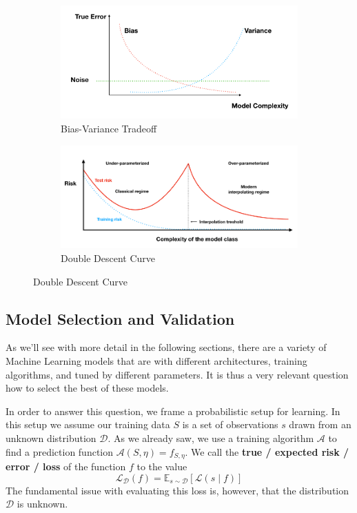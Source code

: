 \documentclass{article}
\newcommand{\E}{\mathbb{E}}
\newcommand{\loss}{\mathcal{L}}
\newcommand{\dist}{\mathcal{D}}
\begin{document}
\begin{figure}[h]
    \centering
    \begin{subfigure}{.5\textwidth}
	\centering
	\includegraphics[width=.9\linewidth]{figures/bias-variance-tradeoff.png}
	\caption{Bias-Variance Tradeoff}
	\label{fig:bias-variance-tradeoff}
    \end{subfigure}%
    \begin{subfigure}{.5\textwidth}
	\centering
	\includegraphics[width=.9\linewidth]{figures/double-descent-curve.png}
	\caption{Double Descent Curve}
	\label{fig:double-descent-curve}
    \end{subfigure}
\end{figure}


\subsection{Model Selection and Validation}

As we'll see with more detail in the following sections, there are a variety of Machine Learning models that are with different architectures, training algorithms, and tuned by different parameters.
It is thus a very relevant question how to select the best of these models.

In order to answer this question, we frame a probabilistic setup for learning.
In this setup we assume our training data $S$ is a set of observations $s$ drawn from an unknown distribution $\dist$.
As we already saw, we use a training algorithm $\mathcal{A}$ to find a prediction function $\mathcal{A}(S, \eta) = f_{S, \eta}$.
We call the \textbf{true / expected risk / error / loss} of the function $f$ to the value
$$
\loss_\dist(f) = \E_{s \sim \dist} \left[ \loss(s \mid f) \right]
$$
The fundamental issue with evaluating this loss is, however, that the distribution $\dist$ is unknown.
\end{document}
